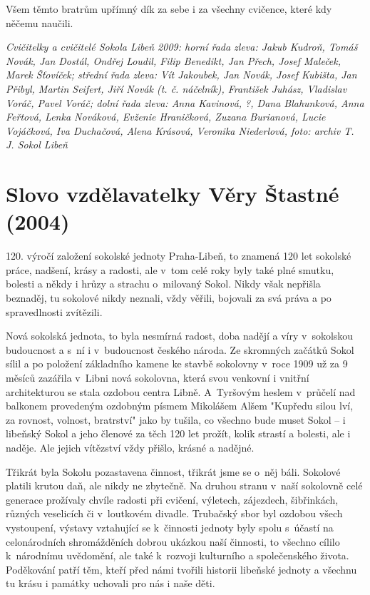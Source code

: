 \documentclass[a5paper, 12pt, twoside]{article}
\begin{document}
Všem těmto bratrům upřímný dík za sebe i za všechny cvičence, které kdy
něčemu naučili.


\textit{Cvičitelky a cvičitelé Sokola Libeň 2009: horní řada zleva: Jakub
Kudroň, Tomáš Novák, Jan Dostál, Ondřej Loudil, Filip Benedikt, Jan
Přech, Josef Maleček, Marek Šťovíček; střední řada zleva: Vít Jakoubek,
Jan Novák, Josef Kubišta, Jan Přibyl, Martin Seifert, Jiří Novák (t. č.
náčelník), František Juhász, Vladislav Voráč, Pavel Voráč; dolní řada
zleva: Anna Kavinová, ?, Dana Blahunková, Anna Feřtová, Lenka Nováková,
Evženie Hraničková, Zuzana Burianová, Lucie Vojáčková, Iva Duchačová,
Alena Krásová, Veronika Niederlová, foto: archiv T. J. Sokol Libeň}

\section{Slovo vzdělavatelky Věry Štastné
(2004)}

120. výročí založení sokolské jednoty Praha-Libeň, to znamená 120 let
sokolské práce, nadšení, krásy a radosti, ale v~tom celé roky byly také
plné smutku, bolesti a někdy i hrůzy a strachu o~milovaný Sokol. Nikdy
však nepřišla beznaděj, tu sokolové nikdy neznali, vždy věřili, bojovali
za svá práva a po spravedlnosti zvítězili.

Nová sokolská jednota, to byla nesmírná radost, doba nadějí a víry
v~sokolskou budoucnost a s~ní i v~budoucnost českého národa. Ze skromných
začátků Sokol sílil a po položení základního kamene ke stavbě sokolovny
v~roce 1909 už za 9 měsíců zazářila v~Libni nová sokolovna, která svou
venkovní i vnitřní architekturou se stala ozdobou centra Libně.
A~Tyršovým heslem v~průčelí nad balkonem provedeným ozdobným písmem
Mikolášem Alšem "Kupředu silou lví, za rovnost, volnost, bratrství"
jako by tušila, co všechno bude muset Sokol --⁠⁠⁠⁠⁠⁠ i libeňský Sokol a jeho
členové za těch 120 let prožít, kolik strastí a bolesti, ale i naděje.
Ale jejich vítězství vždy přišlo, krásné a nadějné.

Třikrát byla Sokolu pozastavena činnost, třikrát jsme se o~něj báli.
Sokolové platili krutou daň, ale nikdy ne zbytečně. Na druhou stranu
v~naší sokolovně celé generace prožívaly chvíle radosti při cvičení,
výletech, zájezdech, šibřinkách, různých veselicích či v~loutkovém
divadle. Trubačský sbor byl ozdobou všech vystoupení, výstavy vztahující
se k~činnosti jednoty byly spolu s~účastí na celonárodních shromážděních
dobrou ukázkou naší činnosti, to všechno cílilo k~národnímu uvědomění,
ale také k~rozvoji kulturního a společenského života. Poděkování patří
těm, kteří před námi tvořili historii libeňské jednoty a všechnu tu
krásu i památky uchovali pro nás i naše děti.
\end{document}
